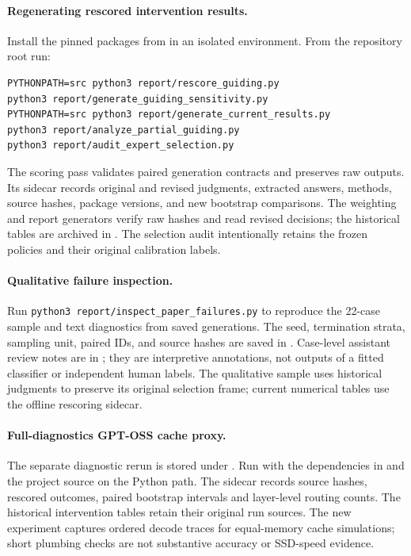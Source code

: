 \paragraph{Regenerating rescored intervention results.}
Install the pinned packages from 
in an isolated environment. From the repository root run:
\begin{verbatim}
PYTHONPATH=src python3 report/rescore_guiding.py
python3 report/generate_guiding_sensitivity.py
PYTHONPATH=src python3 report/generate_current_results.py
python3 report/analyze_partial_guiding.py
python3 report/audit_expert_selection.py
\end{verbatim}
The scoring pass validates paired generation contracts and preserves raw
outputs. Its sidecar records original and revised judgments, extracted
answers, methods, source hashes, package versions, and new bootstrap
comparisons. The weighting and report generators verify raw hashes and
read revised decisions; the historical tables are archived in
. The selection audit intentionally
retains the frozen policies and their original calibration labels.

\paragraph{Qualitative failure inspection.}
Run \texttt{python3 report/inspect\_paper\_failures.py} to reproduce the
22-case sample and text diagnostics from saved generations. The seed,
termination strata, sampling unit, paired IDs, and source hashes are saved
in . Case-level assistant review
notes are in ; they are interpretive
annotations, not outputs of a fitted classifier or independent human labels.
The qualitative sample uses historical judgments to preserve its original
selection frame; current numerical tables use the offline rescoring sidecar.


\paragraph{Full-diagnostics GPT-OSS cache proxy.}
The separate diagnostic rerun is stored under
.
Run  with the dependencies in
 and the project source on the Python path.
The sidecar  records source hashes,
rescored outcomes, paired bootstrap intervals and layer-level routing counts.
The historical intervention tables retain their original run sources.
The new  experiment captures ordered
decode traces for equal-memory cache simulations; short plumbing checks are
not substantive accuracy or SSD-speed evidence.



